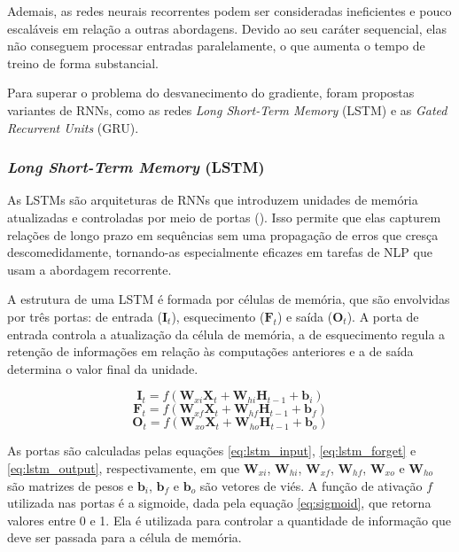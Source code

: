 Ademais, as redes neurais recorrentes podem ser consideradas ineficientes e pouco escaláveis em relação a outras abordagens. Devido ao seu caráter sequencial, elas não conseguem processar entradas paralelamente, o que aumenta o tempo de treino de forma substancial.

Para superar o problema do desvanecimento do gradiente, foram propostas variantes de RNNs, como as redes \textit{Long Short-Term Memory} (LSTM) e as \textit{Gated Recurrent Units} (GRU).

\subsubsection{\textit{Long Short-Term Memory} (LSTM)}

As LSTMs são arquiteturas de RNNs que introduzem unidades de memória atualizadas e controladas por meio de portas (\cite{hochreiter1997long}). Isso permite que elas capturem relações de longo prazo em sequências sem uma propagação de erros que cresça descomedidamente, tornando-as especialmente eficazes em tarefas de NLP que usam a abordagem recorrente.

A estrutura de uma LSTM é formada por células de memória, que são envolvidas por três portas: de entrada ($\boldsymbol{I}_{t}$), esquecimento ($\boldsymbol{F}_{t}$) e saída ($\boldsymbol{O}_{t}$). A porta de entrada controla a atualização da célula de memória, a de esquecimento regula a retenção de informações em relação às computações anteriores e a de saída determina o valor final da unidade.

\begin{equation}
    \label{eq:lstm_input}
    \boldsymbol{I}_{t} = f \left( \boldsymbol{W}_{xi} \boldsymbol{X}_{t} + \boldsymbol{W}_{hi} \boldsymbol{H}_{t-1} + \boldsymbol{b}_{i} \right)
\end{equation}
\begin{equation}
    \label{eq:lstm_forget}
    \boldsymbol{F}_{t} = f \left( \boldsymbol{W}_{xf} \boldsymbol{X}_{t} + \boldsymbol{W}_{hf} \boldsymbol{H}_{t-1} + \boldsymbol{b}_{f} \right)
\end{equation}
\begin{equation}
    \label{eq:lstm_output}
    \boldsymbol{O}_{t} = f \left( \boldsymbol{W}_{xo} \boldsymbol{X}_{t} + \boldsymbol{W}_{ho} \boldsymbol{H}_{t-1} + \boldsymbol{b}_{o} \right)
\end{equation}

As portas são calculadas pelas equações \ref{eq:lstm_input}, \ref{eq:lstm_forget} e \ref{eq:lstm_output}, respectivamente, em que $\boldsymbol{W}_{xi}$, $\boldsymbol{W}_{hi}$, $\boldsymbol{W}_{xf}$, $\boldsymbol{W}_{hf}$, $\boldsymbol{W}_{xo}$ e $\boldsymbol{W}_{ho}$ são matrizes de pesos e $\boldsymbol{b}_{i}$, $\boldsymbol{b}_{f}$ e $\boldsymbol{b}_{o}$ são vetores de viés. A função de ativação $f$ utilizada nas portas é a sigmoide, dada pela equação \ref{eq:sigmoid}, que retorna valores entre 0 e 1. Ela é utilizada para controlar a quantidade de informação que deve ser passada para a célula de memória.

